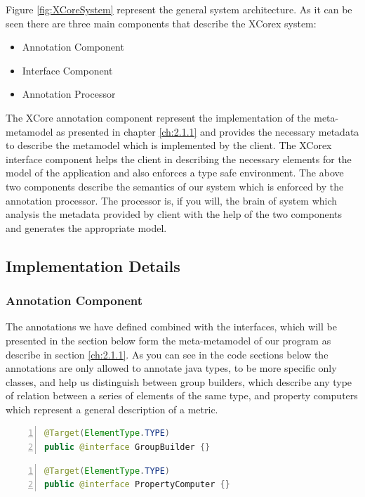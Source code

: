 	Figure \ref{fig:XCoreSystem} represent the  general system architecture. 
As it can be seen there are three main components that describe the XCorex
system:
	\begin{itemize}
	  \item Annotation Component
	  \item Interface  Component
	  \item Annotation Processor
	\end{itemize}
	The XCore annotation component represent the implementation of the
meta-metamodel as presented in chapter \ref{ch:2.1.1} and provides the necessary
metadata to describe the metamodel which is implemented by the client. 
	The XCorex interface component helps the client in describing the necessary
elements for the model of the application and also enforces a type safe environment.
	The above two components describe the semantics of our system which is enforced 
by the annotation processor. The processor is, if you will, the brain of system
which analysis the metadata provided by client with the help of the two
components and generates the appropriate model. 

\subsection{Implementation Details}

\subsubsection{Annotation Component}

	The annotations we have defined combined with the interfaces, which will be
presented in the section below form the meta-metamodel of our program as
describe in section \ref{ch:2.1.1}.
	As you can see in the code sections below the annotations are only allowed to
annotate java types, to be more specific only classes, and help us distinguish between
group builders, which describe any type of relation between a series of elements of the same type, and property
computers which represent a general description of a metric. 

		\small
	\begin{lstlisting}[language=Java,numbers=left]
@Target(ElementType.TYPE)
public @interface GroupBuilder {}	
	\end{lstlisting}
	\normalsize{} \label{codeSection:GroupBuild}
	
		\small
	\begin{lstlisting}[language=Java,numbers=left]
@Target(ElementType.TYPE)
public @interface PropertyComputer {}
	\end{lstlisting}
	\normalsize{} \label{codeSection:PropertyComputer} 

